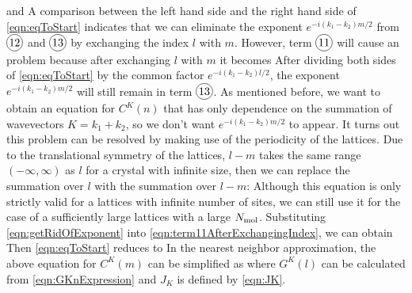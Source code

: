 and 
A comparison between the left hand side and the right hand side of \autoref{eqn:eqToStart} indicates that 
we can eliminate the exponent $e^{- i (k_1 - k_2 ) m /2}$ from $\text{\circled{12}}$ and $\text{\circled{13}}$ by
 exchanging the index $l$ with $m$. However, term $\text{\circled{11}}$ will cause an problem because after 
exchanging $l$ with $m$ it becomes
After dividing both sides of \autoref{eqn:eqToStart} by the common factor $e^{- i (k_1 - k_2 ) l /2}$, the exponent
$e^{-i(k_1 - k_2 )m/2}$ will still remain in term  $\text{\circled{13}}$. As mentioned before, we want to obtain an 
equation for $C^{K}(n)$ that has only dependence on the summation of wavevectors $K = k_1 + k_2$, so we don't 
want $e^{-i(k_1 - k_2 )m/2}$ to appear. It turns out this problem can be resolved by making use of the periodicity of
 the lattices. Due to the translational symmetry of the lattices, $l-m$ takes the same range $(-\infty, \infty)$ as $l$ for
a crystal with infinite size, then we can replace the summation over $l$ with the summation over $l-m$:
Although this equation is only strictly valid for a lattices with infinite number of sites, we can still use it for the case
of a sufficiently large lattices with a large $N_{\rm mol}$.  Substituting \autoref{eqn:getRidOfExponent} into 
\autoref{eqn:term11AfterExchangingIndex}, we can obtain
Then  \autoref{eqn:eqToStart} reduces to
In the nearest neighbor approximation, the above equation for $C^{K}(m)$ can be simplified as
where  $G^{K}(l)$ can be calculated from \autoref{eqn:GKnExpression} and $J_K$ is defined by \autoref{eqn:JK}. 

